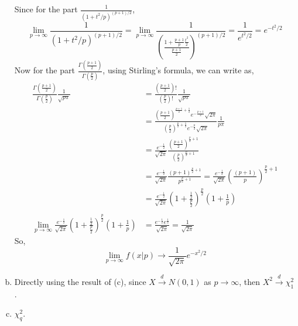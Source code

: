 \documentclass[letterpaper]{article}
\newcommand{\convd}{\stackrel{d}{\to}}
\newcommand{\pbt}{\frac{p}{2}}
\begin{document}
\begin{enumerate}[(a)]
Since for the part $\frac{1}{(1+t^2/p)^{(p+1)/2}}$,
\[
\lim_{p \to \infty} \frac{1}{(1+t^2/p)^{(p+1)/2}} = \lim_{p \to \infty} \frac{1}{\left(\frac{1+\frac{p+1}{p} \frac{t^2}{2}}{\frac{p+1}{2}}\right)^{(p+1)/2}} = \frac{1}{e^{t^2/2}} = e^{-t^2/2}
\]
Now for the part $\frac{\Gamma(\frac{p+1}{2})}{\Gamma(\pbt)}$, using Stirling's formula, we can write as,
\begin{align*}
\frac{\Gamma(\frac{p+1}{2})}{\Gamma(\pbt)} \frac{1}{\sqrt{p\pi}} &= \frac{(\frac{p+1}{2})!}{(\pbt)!}\frac{1}{\sqrt{p\pi}} \\
& = \frac{(\frac{p+1}{2})^{\frac{p+1}{2}+\frac{1}{2}} e^{-\frac{p+1}{2}} \sqrt{2\pi}}{(\pbt)^{\pbt+\frac{1}{2}} e^{-\pbt} \sqrt{2\pi}} \frac{1}{p \pi} \\
& = \frac{e^{-\frac{1}{2}}}{\sqrt{2 \pi}} \frac{(\frac{p+1}{2})^{\pbt + 1}}{(\pbt)^{\pbt+1}} \\
& = \frac{e^{-\frac{1}{2}}}{\sqrt{2 \pi}} \frac{(p+1)^{\pbt + 1}}{p^{\pbt+1}}  = \frac{e^{-\frac{1}{2}}}{\sqrt{2 \pi}} \left(\frac{(p+1)}{p}\right)^{\pbt + 1} \\ 
& = \frac{e^{-\frac{1}{2}}}{\sqrt{2 \pi}} \left(1+\frac{\frac{1}{2}}{\frac{p}{2}}\right)^{\pbt}(1+\frac{1}{p}) \\ 
\\
\lim_{p \to \infty} \frac{e^{-\frac{1}{2}}}{\sqrt{2 \pi}} \left(1+\frac{\frac{1}{2}}{\frac{p}{2}}\right)^{\pbt}(1+\frac{1}{p}) & = \frac{e^{-\frac{1}{2}} e^\frac{1}{2}}{\sqrt{2\pi}} = \frac{1}{\sqrt{2\pi}}
\end{align*}
So, 
\[
\lim_{p \to \infty} f(x|p) \to \frac{1}{\sqrt{2\pi}} e^{-x^2/2}
\]
\item
Directly using the result of (c), since $X \convd N(0, 1)$ as $p \to \infty$, then $X^2 \convd \chi^2_1$.
\item
$\chi_q^2$.
\end{enumerate}
\end{document}
